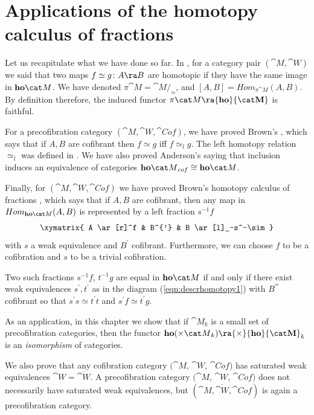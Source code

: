 
\chapter{Applications of the homotopy calculus of fractions}
\label{chap:homcalsappl}

Let us recapitulate what we have done so far. In , for a category pair $({\cat M}, {\cat W})$ we said that two maps $f \simeq g \colon A \ra B$ are homotopic if they have the same image in ${\bf ho}{\cat M}$. We have denoted $\pi {\cat M} = {\cat M} /_\simeq$, and $[A,B] = Hom_{\pi {\cat M}}(A, B)$. By definition therefore, the induced functor $\pi{\cat M} \ra {\bf ho}{\cat M}$ is faithful.

For a precofibration category $({\cat M}, {\cat W}, {\cat Cof})$, we have proved Brown's , which says that if $A, B$ are cofibrant then $f \simeq g$ iff $f \simeq_l g$. The left homotopy relation $\simeq_l$ was defined in . We have also proved Anderson's  saying that inclusion induces an equivalence of categories ${\bf ho}{\cat M}_{cof} \cong {\bf ho}{\cat M}$. 

Finally, for $({\cat M}, {\cat W}, {\cat Cof})$ we have proved Brown's homotopy calculus of fractions , which says that if $A, B$ are cofibrant, then any map in $Hom_{{\bf ho}{\cat M}}(A, B)$ is represented by a left fraction $s^{-1}f$
\[
\xymatrix{ A \ar[r]^f & B^{'} & B \ar[l]_-s^-\sim
  }
\]
with $s$ a weak equivalence and $B^{'}$ cofibrant. Furthermore, we can choose $f$ to be a cofibration and $s$ to be a trivial cofibration. 

Two such fractions $s^{-1}f$, $t^{-1}g$ are equal in ${\bf ho}{\cat M}$ if and only if there exist weak equivalences $s^{'}, t^{'}$ as in the diagram (\ref{eqn:descrhomotopy1}) with $B^{'''}$ cofibrant so that $s^{'}s \simeq t^{'}t$ and $s^{'}f \simeq t^{'}g$.

\bigskip

As an application, in this chapter we show that if ${\cat M}_k$ is a small set of precofibration categories, then the functor ${\bf ho}({\times} {\cat M}_k) \ra {\times}{\bf ho}{\cat M}_k$ is an {\it isomorphism} of categories. 

We also prove that any cofibration category $({\cat M}$, ${\cat W}$, ${\cat Cof})$ has saturated weak equivalences ${\cat W} = \overline{\cat W}$. A precofibration category $({\cat M}$, ${\cat W}$, ${\cat Cof})$ does not necessarily have saturated weak equivalences, but $({\cat M}, \overline{\cat W}, {\cat Cof})$ is again a precofibration category.

